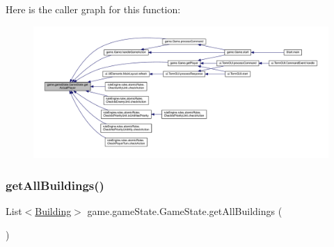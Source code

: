 Here is the caller graph for this function\+:
\nopagebreak
\begin{figure}[H]
\begin{center}
\leavevmode
\includegraphics[width=350pt]{classgame_1_1game_state_1_1_game_state_a418ba65b15c926ef486b0a04090910d0_icgraph}
\end{center}
\end{figure}
\mbox{\label{classgame_1_1game_state_1_1_game_state_a9f60d276ddcdaaca453b1767aa03608a}} 
\subsubsection{\texorpdfstring{get\+All\+Buildings()}{getAllBuildings()}}
{\footnotesize\ttfamily List$<$\mbox{\hyperlink{classgame_1_1board_1_1_building}{Building}}$>$ game.\+game\+State.\+Game\+State.\+get\+All\+Buildings (\begin{DoxyParamCaption}{ }\end{DoxyParamCaption})\hspace{0.3cm}{\ttfamily [inline]}}

